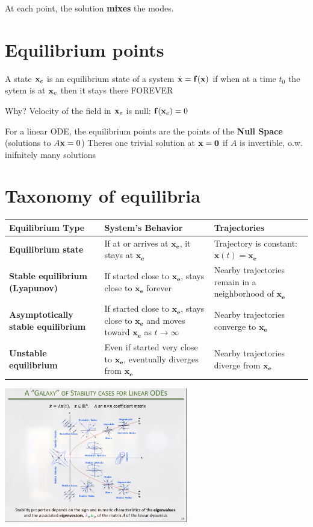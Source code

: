 At each point, the solution \textbf{mixes} the modes.

\section*{Equilibrium points}

A state $\mathbf{x}_e$ is an equilibrium state of a system $\dot{\mathbf{x}} = \mathbf{f}(\mathbf{x})$ if
when at a time $t_0$ the sytem is at $\mathbf{x}_e$ then it stays there FOREVER

Why? Velocity of the field in $\mathbf{x}_e$ is null: $\mathbf{f}(\mathbf{x}_e) = 0$


For a linear ODE, the equilibrium points are the points of the \textbf{Null Space} (solutions to $A \mathbf{x} = 0$)
Theres one trivial solution at $\mathbf{x} = \mathbf{0}$ if $A$ is invertible, o.w. inifnitely many solutions

\section*{Taxonomy of equilibria}

\begin{table}[h!]
\centering
\renewcommand{\arraystretch}{1.3}
\setlength{\tabcolsep}{8pt}
\begin{tabular}{>{\bfseries}m{3.5cm} m{6cm} m{5cm}}
\textbf{Equilibrium Type} & \textbf{System’s Behavior} & \textbf{Trajectories} \\
\midrule
Equilibrium state &
If at or arrives at $\mathbf{x_e}$, it stays at $\mathbf{x_e}$ &
Trajectory is constant: $\mathbf{x}(t) = \mathbf{x_e}$ \\

Stable equilibrium (Lyapunov) &
If started close to $\mathbf{x_e}$, stays close to $\mathbf{x_e}$ forever &
Nearby trajectories remain in a neighborhood of $\mathbf{x_e}$ \\

Asymptotically stable equilibrium &
If started close to $\mathbf{x_e}$, stays close to $\mathbf{x_e}$ and moves toward $\mathbf{x_e}$ as $t \to \infty$ &
Nearby trajectories converge to $\mathbf{x_e}$ \\

Unstable equilibrium &
Even if started very close to $\mathbf{x_e}$, eventually diverges from $\mathbf{x_e}$ &
Nearby trajectories diverge from $\mathbf{x_e}$ \\
\bottomrule
\end{tabular}
\end{table}

\begin{center}
    \includegraphics[width=0.6\textwidth]{images/image.png}
\end{center}


